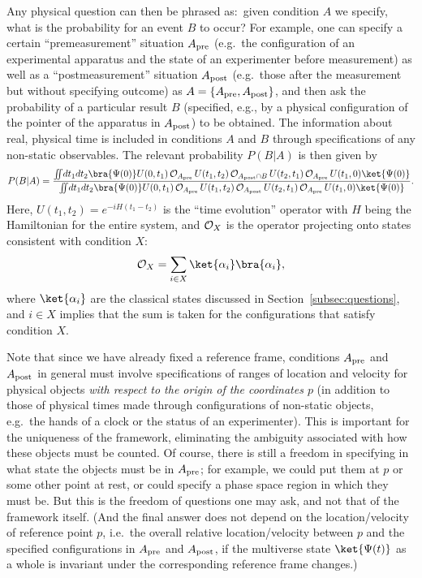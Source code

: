 \documentclass[12pt]{article}
\begin{document}
Any physical question can then be phrased as:\ given condition $A$ 
we specify, what is the probability for an event $B$ to occur? 
For example, one can specify a certain ``premeasurement'' situation 
$A_{\rm pre}$ (e.g.\ the configuration of an experimental apparatus 
and the state of an experimenter before measurement) as well as a 
``postmeasurement'' situation $A_{\rm post}$ (e.g.\ those after the 
measurement but without specifying outcome) as $A = \{ A_{\rm pre}, 
A_{\rm post} \}$, and then ask the probability of a particular result 
$B$ (specified, e.g., by a physical configuration of the pointer of 
the apparatus in $A_{\rm post}$) to be obtained.  The information 
about real, physical time is included in conditions $A$ and $B$ through 
specifications of any non-static observables.  The relevant probability 
$P(B|A)$ is then given by
%
\begin{equation}
  P(B|A) = \frac{\int\!\!\!\int\!dt_1 dt_2 \bra{\Psi(0)} U(0,t_1)\, 
      {\cal O}_{A_{\rm pre}}\, U(t_1,t_2)\, {\cal O}_{A_{\rm post} \cap B}\, 
      U(t_2,t_1)\, {\cal O}_{A_{\rm pre}}\, U(t_1,0) \ket{\Psi(0)}}
    {\int\!\!\!\int\!dt_1 dt_2 \bra{\Psi(0)} U(0,t_1)\, 
      {\cal O}_{A_{\rm pre}}\, U(t_1,t_2)\, {\cal O}_{A_{\rm post}}\, 
      U(t_2,t_1)\, {\cal O}_{A_{\rm pre}}\, U(t_1,0) \ket{\Psi(0)}}.
\label{eq:prob-final}
\end{equation}
%
Here, $U(t_1,t_2) = e^{-iH(t_1-t_2)}$ is the ``time evolution'' operator 
with $H$ being the Hamiltonian for the entire system, and ${\cal O}_X$ 
is the operator projecting onto states consistent with condition $X$:
%
\begin{equation}
  {\cal O}_X = \sum_{i \in X} \ket{\alpha_i} \bra{\alpha_i},
\label{eq:O_A-O_B}
\end{equation}
%
where $\ket{\alpha_i}$ are the classical states discussed in 
Section~\ref{subsec:questions}, and $i \in X$ implies that the sum 
is taken for the configurations that satisfy condition $X$.

Note that since we have already fixed a reference frame, conditions 
$A_{\rm pre}$ and $A_{\rm post}$ in general must involve specifications 
of ranges of location and velocity for physical objects {\it with respect 
to the origin of the coordinates $p$} (in addition to those of physical 
times made through configurations of non-static objects, e.g.\ the hands 
of a clock or the status of an experimenter).  This is important for 
the uniqueness of the framework, eliminating the ambiguity associated 
with how these objects must be counted.  Of course, there is still a 
freedom in specifying in what state the objects must be in $A_{\rm pre}$; 
for example, we could put them at $p$ or some other point at rest, or 
could specify a phase space region in which they must be.  But this 
is the freedom of questions one may ask, and not that of the framework 
itself.  (And the final answer does not depend on the location/velocity 
of reference point $p$, i.e.\ the overall relative location/velocity 
between $p$ and the specified configurations in $A_{\rm pre}$ and 
$A_{\rm post}$, if the multiverse state $\ket{\Psi(t)}$ as a whole 
is invariant under the corresponding reference frame changes.)
\end{document}
